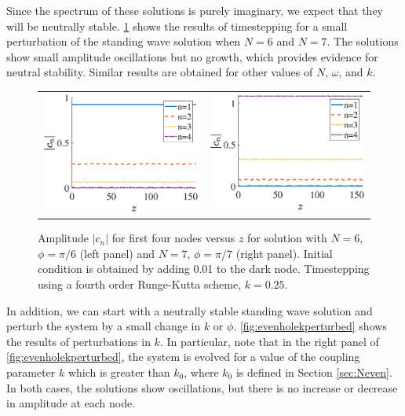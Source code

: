 \documentclass[12pt,reqno]{amsart}
\begin{document}
Since the spectrum of these solutions is purely imaginary, we expect that they will be neutrally stable.  \cref{fig:evenhole6perturbed} shows the results of timestepping for a small perturbation of the standing wave solution when $N=6$ and $N=7$. The solutions show small amplitude oscillations but no growth, which provides evidence for neutral stability. Similar results are obtained for other values of $N$, $\omega$, and $k$.
\begin{figure}[H]
\begin{center}
\begin{tabular}{cc}
\includegraphics[width=7.5cm]{images/evenhole6perturbed.eps} & 
\includegraphics[width=7.5cm]{images/oddhole7perturbed.eps}
\end{tabular}
\end{center}
\caption{Amplitude $|c_n|$ for first four nodes versus $z$ for solution with $N=6$,  $\phi = \pi/6$ (left panel) and $N=7$, $\phi = \pi/7$ (right panel). Initial condition is obtained by adding 0.01 to the dark node. Timestepping using a fourth order Runge-Kutta scheme, $k=0.25$.}
\label{fig:evenhole6perturbed}
\end{figure}
In addition, we can start with a neutrally stable standing wave solution and perturb the system by a small change in $k$ or $\phi$. \cref{fig:evenholekperturbed} shows the results of perturbations in $k$. In particular, note that in the right panel of \cref{fig:evenholekperturbed}, the system is evolved for a value of the coupling parameter $k$ which is greater than $k_0$, where $k_0$ is defined in Section \ref{sec:Neven}. In both cases, the solutions show oscillations, but there is no increase or decrease in amplitude at each node.
\end{document}
